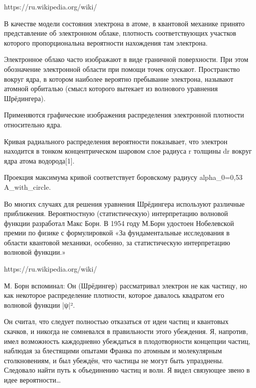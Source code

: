 https://ru.wikipedia.org/wiki/%
{
В качестве модели состояния электрона в атоме, в квантовой механике принято представление об электронном облаке, плотность соответствующих участков которого пропорциональна вероятности нахождения там электрона.

Электронное облако часто изображают в виде граничной поверхности. При этом обозначение электронной области при помощи точек опускают. Пространство вокруг ядра, в котором наиболее вероятно пребывание электрона, называют атомной орбиталью (смысл которого вытекает из волнового уравнения Шрёдингера).

Применяются графические изображения распределения электронной плотности относительно ядра.

Кривая радиального распределения вероятности показывает, что электрон находится в тонком концентрическом шаровом слое радиуса r толщины dr вокруг ядра атома водорода[1].

Проекция максимума кривой соответствует боровскому радиусу alpha_0=0,53 A_with_circle.

Во многих случаях для решения уравнения Шрёдингера используют различные приближения. Вероятностную (статистическую) интерпретацию волновой функции разработал Макс Борн. В 1954 году М.Борн удостоен Нобелевской премии по физике с формулировкой «За фундаментальные исследования в области квантовой механики, особенно, за статистическую интерпретацию волновой функции.»
}

https://ru.wikipedia.org/wiki/%
{
М. Борн вспоминал:
Он (Шрёдингер) рассматривал электрон не как частицу, но как некоторое распределение плотности, которое давалось квадратом его волновой функции |ψ|².

Он считал, что следует полностью отказаться от идеи частиц и квантовых скачков, и никогда не сомневался в правильности этого убеждения. Я, напротив, имел возможность каждодневно убеждаться в плодотворности концепции частиц, наблюдая за блестящими опытами Франка по атомным и молекулярным столкновениям, и был убеждён, что частицы не могут быть упразднены. Следовало найти путь к объединению частиц и волн. Я видел связующее звено в идее вероятности…
}









